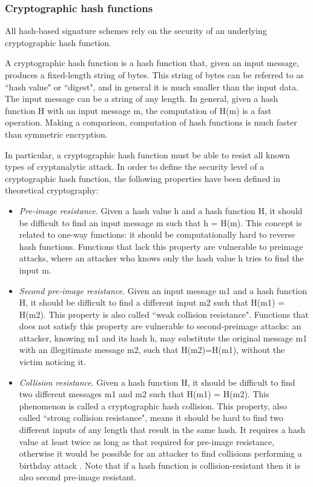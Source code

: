 \documentclass[a4paper,12pt]{article}
\begin{document}
\subsubsection{Cryptographic hash functions}
\label{subsub:hash}

All hash-based signature schemes rely on the security of an underlying cryptographic hash function. 

A cryptographic hash function is a hash function that, given an input message, produces a fixed-length string of bytes. This string of bytes can be referred to as ``hash value" or ``digest", and in general it is much smaller than the input data. The input message can be a string of any length.
In general, given a hash function H with an input message m, the computation of H(m) is a fast operation.
Making a comparison, computation of hash functions is much faster than symmetric encryption.

In particular, a cryptographic hash function must be able to resist all known types of cryptanalytic attack. In order to define the security level of a cryptographic hash function, the following properties have been defined in theoretical cryptography:
\begin{itemize}
	\item \textit{Pre-image resistance}. Given a hash value h and a hash function H, it should be difficult to find an input message m such that h = H(m). This concept is related to one-way functions: it should be computationally hard to reverse hash functions. Functions that lack this property are vulnerable to preimage attacks, where an attacker who knows only the hash value h tries to find the input m.	
	\item \textit{Second pre-image resistance}. Given an input message m1 and a hash function H, it should be difficult to find a different input m2 such that H(m1) = H(m2). This property is also called ``weak collision resistance". Functions that does not satisfy this property are vulnerable to second-preimage attacks: an attacker, knowing m1 and its hash h, may substitute the original message m1 with an illegitimate message m2, such that H(m2)=H(m1), without the victim noticing it.
	\item \textit{Collision resistance}. Given a hash function H, it should be difficult to find two different messages m1 and m2 such that H(m1) = H(m2). This phenomenon is called a cryptographic hash collision. This property, also called ``strong collision resistance", means it should be hard to find two different inputs of any length that result in the same hash. It requires a hash value at least twice as long as that required for pre-image resistance, otherwise it would be possible for an attacker to find collisions performing a birthday attack \cite{34_birthday}. Note that if a hash function is collision-resistant then it is also second pre-image resistant.
\end{itemize}
\end{document}
